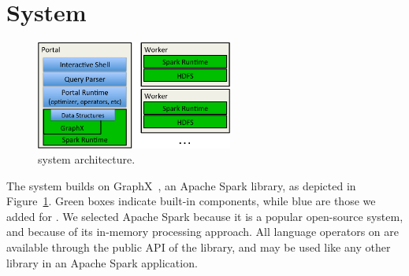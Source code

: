 \section{System}
\label{sec:sys}

\begin{figure}[t!]
\begin{center}
\includegraphics[height=1.4in]{figs/architecture.pdf}
\caption{\ql system architecture.}
\label{fig:arch}
\end{center}
\end{figure}

The \ql system builds on GraphX~\cite{DBLP:conf/osdi/GonzalezXDCFS14},
an Apache Spark library, as depicted in Figure~\ref{fig:arch}.  Green
boxes indicate built-in components, while blue are those we added for
\ql.  We selected Apache Spark because it is a popular open-source
system, and because of its in-memory processing approach.  All
language operators on \tgs are available through the public API of the
\ql library, and may be used like any other library in an Apache Spark
application.



